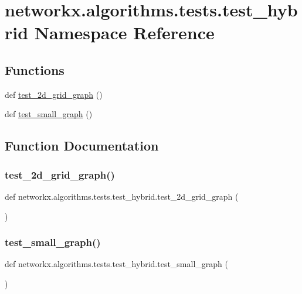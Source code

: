 \hypertarget{namespacenetworkx_1_1algorithms_1_1tests_1_1test__hybrid}{}\section{networkx.\+algorithms.\+tests.\+test\+\_\+hybrid Namespace Reference}
\label{namespacenetworkx_1_1algorithms_1_1tests_1_1test__hybrid}
\subsection*{Functions}
\begin{DoxyCompactItemize}
\item 
def \hyperlink{namespacenetworkx_1_1algorithms_1_1tests_1_1test__hybrid_a43976d833bd93de613fd36c05775b078}{test\+\_\+2d\+\_\+grid\+\_\+graph} ()
\item 
def \hyperlink{namespacenetworkx_1_1algorithms_1_1tests_1_1test__hybrid_a0b9534fb3a40693d6a7fa56f0a51b637}{test\+\_\+small\+\_\+graph} ()
\end{DoxyCompactItemize}


\subsection{Function Documentation}
\mbox{\label{namespacenetworkx_1_1algorithms_1_1tests_1_1test__hybrid_a43976d833bd93de613fd36c05775b078}} 
\subsubsection{\texorpdfstring{test\+\_\+2d\+\_\+grid\+\_\+graph()}{test\_2d\_grid\_graph()}}
{\footnotesize\ttfamily def networkx.\+algorithms.\+tests.\+test\+\_\+hybrid.\+test\+\_\+2d\+\_\+grid\+\_\+graph (\begin{DoxyParamCaption}{ }\end{DoxyParamCaption})}

\mbox{\label{namespacenetworkx_1_1algorithms_1_1tests_1_1test__hybrid_a0b9534fb3a40693d6a7fa56f0a51b637}} 
\subsubsection{\texorpdfstring{test\+\_\+small\+\_\+graph()}{test\_small\_graph()}}
{\footnotesize\ttfamily def networkx.\+algorithms.\+tests.\+test\+\_\+hybrid.\+test\+\_\+small\+\_\+graph (\begin{DoxyParamCaption}{ }\end{DoxyParamCaption})}

